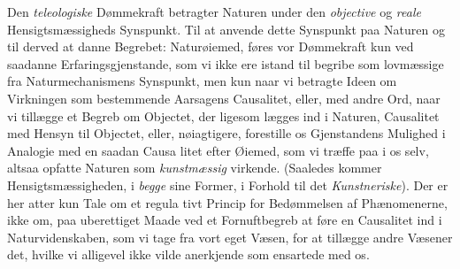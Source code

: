 \documentclass[12pt,a4paper]{book}
\begin{document}
Den \emph{teleologiske} Dømmekraft betragter Naturen under
den \emph{objective} og \emph{reale} Hensigtsmæssigheds Synspunkt. Til
at anvende dette Synspunkt paa Naturen og til derved at
danne Begrebet: Naturøiemed, føres vor Dømmekraft kun ved
saadanne Erfaringsgjenstande, som vi ikke ere istand til begribe
som lovmæssige fra Naturmechanismens Synspunkt, men kun
naar vi betragte Ideen om Virkningen som bestemmende
Aarsagens Causalitet, eller, med andre Ord, naar vi tillægge
et Begreb om Objectet, der ligesom lægges ind i Naturen,
Causalitet med Hensyn til Objectet, eller, nøiagtigere, forestille
os Gjenstandens Mulighed i Analogie med en saadan Causa\-%
litet efter Øiemed, som vi træffe paa i os selv, altsaa opfatte
Naturen som \emph{kunstmæssig} virkende. (Saaledes kommer
Hensigtsmæssigheden, i \emph{begge} sine Former, i Forhold til det
\emph{Kunstneriske}). Der er her atter kun Tale om et regula\-%
tivt Princip for Bedømmelsen af Phænomenerne, ikke om, paa
uberettiget Maade ved et Fornuftbegreb at føre en Causalitet
ind i Naturvidenskaben, som vi tage fra vort eget Væsen, for
at tillægge andre Væsener det, hvilke vi alligevel ikke vilde
anerkjende som ensartede med os.
\end{document}
